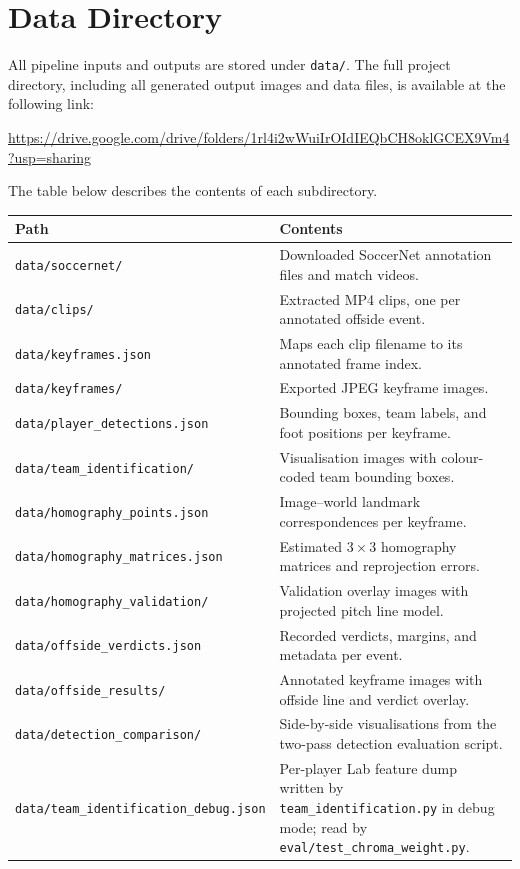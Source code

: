 \section*{Data Directory}

All pipeline inputs and outputs are stored under \texttt{data/}. The full project directory, including all generated output images and data files, is available at the following link:

\begin{center}
\url{https://drive.google.com/drive/folders/1rl4i2wWuiIrOIdIEQbCH8oklGCEX9Vm4?usp=sharing}
\end{center}

The table below describes the contents of each subdirectory.

\begin{tabularx}{\linewidth}{lX}
\hline
Path & Contents \\
\hline
\texttt{data/soccernet/} & Downloaded SoccerNet annotation files and match videos. \\
\texttt{data/clips/} & Extracted MP4 clips, one per annotated offside event. \\
\texttt{data/keyframes.json} & Maps each clip filename to its annotated frame index. \\
\texttt{data/keyframes/} & Exported JPEG keyframe images. \\
\texttt{data/player\_detections.json} & Bounding boxes, team labels, and foot positions per keyframe. \\
\texttt{data/team\_identification/} & Visualisation images with colour-coded team bounding boxes. \\
\texttt{data/homography\_points.json} & Image--world landmark correspondences per keyframe. \\
\texttt{data/homography\_matrices.json} & Estimated $3\times3$ homography matrices and reprojection errors. \\
\texttt{data/homography\_validation/} & Validation overlay images with projected pitch line model. \\
\texttt{data/offside\_verdicts.json} & Recorded verdicts, margins, and metadata per event. \\
\texttt{data/offside\_results/} & Annotated keyframe images with offside line and verdict overlay. \\
\texttt{data/detection\_comparison/} & Side-by-side visualisations from the two-pass detection evaluation script. \\
\texttt{data/team\_identification\_debug.json} & Per-player Lab feature dump written by \texttt{team\_identification.py} in debug mode; read by \texttt{eval/test\_chroma\_weight.py}. \\
\hline
\end{tabularx}

